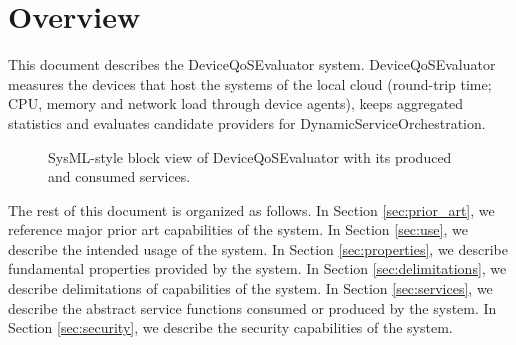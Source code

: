\documentclass[a4paper]{arrowhead}
\begin{document}
\section{Overview}
\label{sec:overview}

This document describes the DeviceQoSEvaluator system. Device\allowbreak{}Qo\allowbreak{}SEvaluator measures the devices that host the systems of the local cloud (round-trip time; CPU, memory and network load through device agents), keeps aggregated statistics and evaluates candidate providers for Dynamic\allowbreak{}Service\allowbreak{}Orchestration.

\begin{figure}[ht!]
  \centering
  \caption{SysML-style block view of DeviceQoSEvaluator with its produced and consumed services.}
  \label{fig:system}
\end{figure}

The rest of this document is organized as follows.
In Section \ref{sec:prior_art}, we reference major prior art capabilities of the system.
In Section \ref{sec:use}, we describe the intended usage of the system.
In Section \ref{sec:properties}, we describe fundamental properties provided by the system.
In Section \ref{sec:delimitations}, we describe delimitations of capabilities of the system.
In Section \ref{sec:services}, we describe the abstract service functions consumed or produced by the system.
In Section \ref{sec:security}, we describe the security capabilities of the system.
\end{document}

